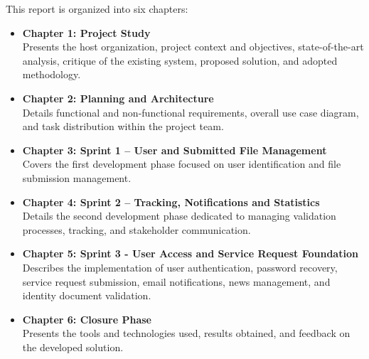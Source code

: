 \vspace{0.2cm}
This report is organized into six chapters:
\begin{itemize}
    \item[\textbullet] \textbf{Chapter 1: Project Study}\\
    Presents the host organization, project context and objectives, state-of-the-art analysis, critique of the existing system, proposed solution, and adopted methodology.
    \vspace{0.5cm}
    
    \item[\textbullet] \textbf{Chapter 2: Planning and Architecture}\\
    Details functional and non-functional requirements, overall use case diagram, and task distribution within the project team.
    \vspace{0.5cm}
    
    \item[\textbullet] \textbf{Chapter 3: Sprint 1 – User and Submitted File Management}\\
    Covers the first development phase focused on user identification and file submission management.
    \vspace{0.5cm}
    
    \item[\textbullet] \textbf{Chapter 4: Sprint 2 – Tracking, Notifications and Statistics}\\
    Details the second development phase dedicated to managing validation processes, tracking, and stakeholder communication.
    \vspace{0.5cm}
    
    \item[\textbullet] \textbf{Chapter 5: Sprint 3 - User Access and Service Request Foundation}\\
    Describes the implementation of user authentication, password recovery, service request submission, email notifications, news management, and identity document validation.
    \vspace{0.5cm}
    
    \item[\textbullet] \textbf{Chapter 6: Closure Phase}\\
    Presents the tools and technologies used, results obtained, and feedback on the developed solution.
\end{itemize}
